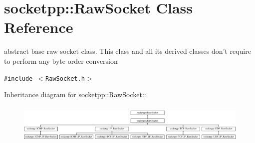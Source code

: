 \hypertarget{classsocketpp_1_1RawSocket}{
\section{socketpp::RawSocket Class Reference}
\label{classsocketpp_1_1RawSocket}
}
abstract base raw socket class. This class and all its derived classes don't require to perform any byte order conversion  


{\tt \#include $<$RawSocket.h$>$}

Inheritance diagram for socketpp::RawSocket::\begin{figure}[H]
\begin{center}
\leavevmode
\includegraphics[height=1.9244cm]{classsocketpp_1_1RawSocket}
\end{center}
\end{figure}
